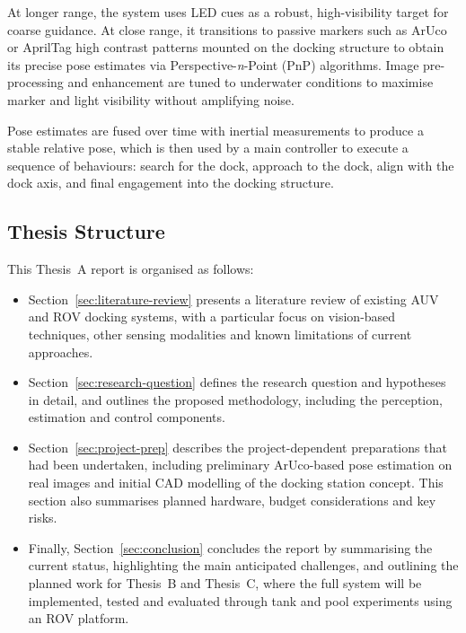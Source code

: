 At longer range, the system uses LED cues as a robust, high-visibility target for coarse guidance. At close range, it transitions to passive markers such as ArUco or AprilTag high contrast patterns mounted on the docking structure to obtain its precise pose estimates via Perspective-\emph{n}-Point (PnP) algorithms. Image pre-processing and enhancement are tuned to underwater conditions to maximise marker and light visibility without amplifying noise.

Pose estimates are fused over time with inertial measurements to produce a stable relative pose, which is then used by a main controller to execute a sequence of behaviours: search for the dock, approach to the dock, align with the dock axis, and final engagement into the docking structure.

\subsection{Thesis Structure}

This Thesis~A report is organised as follows:
\begin{itemize}
	\item Section~\ref{sec:literature-review} presents a literature review of existing AUV and ROV docking systems, with a particular focus on vision-based techniques, other sensing modalities and known limitations of current approaches.
	\item Section~\ref{sec:research-question} defines the research question and hypotheses in detail, and outlines the proposed methodology, including the perception, estimation and control components.
	\item Section~\ref{sec:project-prep} describes the project-dependent preparations that had been undertaken, including preliminary ArUco-based pose estimation on real images and initial CAD modelling of the docking station concept. This section also summarises planned hardware, budget considerations and key risks.
	\item Finally, Section~\ref{sec:conclusion} concludes the report by summarising the current status, highlighting the main anticipated challenges, and outlining the planned work for Thesis~B and Thesis~C, where the full system will be implemented, tested and evaluated through tank and pool experiments using an ROV platform.
\end{itemize}